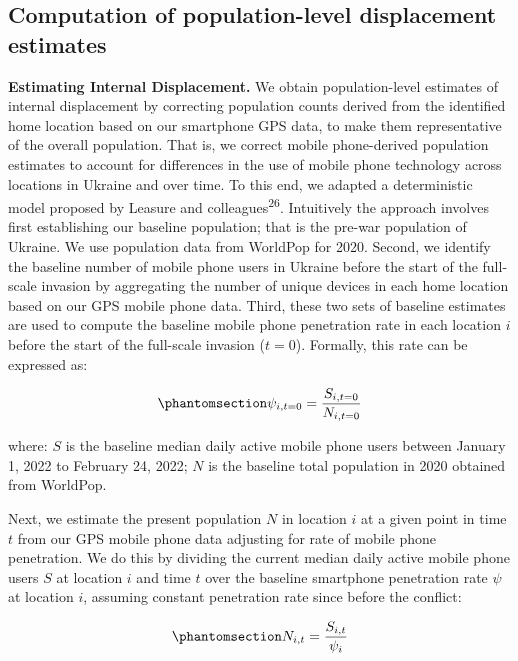 \documentclass[
  11pt,
]{article}
\begin{document}
\subsection{Computation of population-level displacement
estimates}\label{sec-methods2.2}

\textbf{Estimating Internal Displacement.} We obtain population-level
estimates of internal displacement by correcting population counts
derived from the identified home location based on our smartphone GPS
data, to make them representative of the overall population. That is, we
correct mobile phone-derived population estimates to account for
differences in the use of mobile phone technology across locations in
Ukraine and over time. To this end, we adapted a deterministic model
proposed by Leasure and colleagues\textsuperscript{26}. Intuitively the
approach involves first establishing our baseline population; that is
the pre-war population of Ukraine. We use population data from WorldPop
for 2020. Second, we identify the baseline number of mobile phone users
in Ukraine before the start of the full-scale invasion by aggregating
the number of unique devices in each home location based on our GPS
mobile phone data. Third, these two sets of baseline estimates are used
to compute the baseline mobile phone penetration rate in each location
\(i\) before the start of the full-scale invasion (\(t=0\)). Formally,
this rate can be expressed as:

\begin{equation}\phantomsection\label{eq-equation1}{ \psi_{i,t=0} = \frac {S_{i,t=0}} {N_{i,t=0}}}\end{equation}

where: \(S\) is the baseline median daily active mobile phone users
between January 1, 2022 to February 24, 2022; \(N\) is the baseline
total population in 2020 obtained from WorldPop.

Next, we estimate the present population \(N\) in location \(i\) at a
given point in time \(t\) from our GPS mobile phone data adjusting for
rate of mobile phone penetration. We do this by dividing the current
median daily active mobile phone users \(S\) at location \(i\) and time
\(t\) over the baseline smartphone penetration rate \(\psi\) at location
\(i\), assuming constant penetration rate since before the conflict:

\begin{equation}\phantomsection\label{eq-equation2}{ N_{i,t} = \frac {S_{i,t}} {\psi_{i}} }\end{equation}
\end{document}
